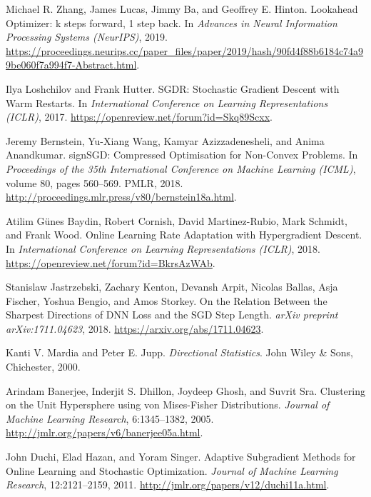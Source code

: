 \begin{thebibliography}{99}
Michael R. Zhang, James Lucas, Jimmy Ba, and Geoffrey E. Hinton.
\newblock Lookahead Optimizer: k steps forward, 1 step back.
\newblock In \emph{Advances in Neural Information Processing Systems (NeurIPS)}, 2019.
\newblock \url{https://proceedings.neurips.cc/paper_files/paper/2019/hash/90fd4f88b6184c74a99be060f7a994f7-Abstract.html}.

Ilya Loshchilov and Frank Hutter.
\newblock SGDR: Stochastic Gradient Descent with Warm Restarts.
\newblock In \emph{International Conference on Learning Representations (ICLR)}, 2017.
\newblock \url{https://openreview.net/forum?id=Skq89Scxx}.

Jeremy Bernstein, Yu-Xiang Wang, Kamyar Azizzadenesheli, and Anima Anandkumar.
\newblock signSGD: Compressed Optimisation for Non-Convex Problems.
\newblock In \emph{Proceedings of the 35th International Conference on Machine Learning (ICML)}, volume 80, pages 560--569. PMLR, 2018.
\newblock \url{http://proceedings.mlr.press/v80/bernstein18a.html}.

Atilim Günes Baydin, Robert Cornish, David Martinez-Rubio, Mark Schmidt, and Frank Wood.
\newblock Online Learning Rate Adaptation with Hypergradient Descent.
\newblock In \emph{International Conference on Learning Representations (ICLR)}, 2018.
\newblock \url{https://openreview.net/forum?id=BkrsAzWAb}.

Stanislaw Jastrzebski, Zachary Kenton, Devansh Arpit, Nicolas Ballas, Asja Fischer, Yoshua Bengio, and Amos Storkey.
\newblock On the Relation Between the Sharpest Directions of DNN Loss and the SGD Step Length.
\newblock \emph{arXiv preprint arXiv:1711.04623}, 2018.
\newblock \url{https://arxiv.org/abs/1711.04623}.

Kanti V. Mardia and Peter E. Jupp.
\newblock \emph{Directional Statistics}.
\newblock John Wiley \& Sons, Chichester, 2000.

Arindam Banerjee, Inderjit S. Dhillon, Joydeep Ghosh, and Suvrit Sra.
\newblock Clustering on the Unit Hypersphere using von Mises-Fisher Distributions.
\newblock \emph{Journal of Machine Learning Research}, 6:1345--1382, 2005.
\newblock \url{http://jmlr.org/papers/v6/banerjee05a.html}.

John Duchi, Elad Hazan, and Yoram Singer.
\newblock Adaptive Subgradient Methods for Online Learning and Stochastic Optimization.
\newblock \emph{Journal of Machine Learning Research}, 12:2121--2159, 2011.
\newblock \url{http://jmlr.org/papers/v12/duchi11a.html}.


\end{thebibliography}
